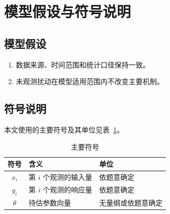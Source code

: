 \section{模型假设与符号说明}

\subsection{模型假设}

\begin{enumerate}
  \item 数据来源、时间范围和统计口径保持一致。
  \item 未观测扰动在模型适用范围内不改变主要机制。
\end{enumerate}

\subsection{符号说明}

本文使用的主要符号及其单位见表~\ref{tab:notation}。

\begin{table}[htbp]
  \centering
  \caption{主要符号}
  \label{tab:notation}
  \begin{tabular}{cll}
    \toprule
    符号 & 含义 & 单位 \\
    \midrule
    $x_i$ & 第 $i$ 个观测的输入量 & 依题意确定 \\
    $y_i$ & 第 $i$ 个观测的响应量 & 依题意确定 \\
    $\theta$ & 待估参数向量 & 无量纲或依题意确定 \\
    \bottomrule
  \end{tabular}
\end{table}
